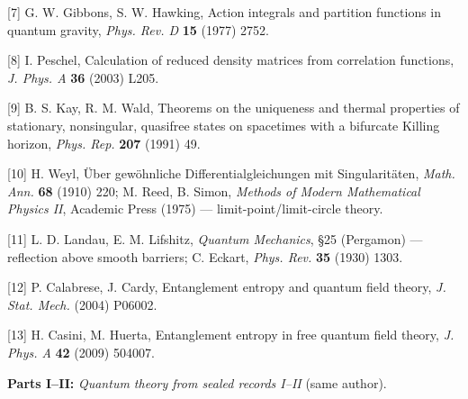 \documentclass[11pt]{article}
\begin{document}
[7] G. W. Gibbons, S. W. Hawking, Action integrals and partition functions in quantum gravity, \emph{Phys. Rev. D} \textbf{15} (1977) 2752.

[8] I. Peschel, Calculation of reduced density matrices from correlation functions, \emph{J. Phys. A} \textbf{36} (2003) L205.

[9] B. S. Kay, R. M. Wald, Theorems on the uniqueness and thermal properties of stationary, nonsingular, quasifree states on spacetimes with a bifurcate Killing horizon, \emph{Phys. Rep.} \textbf{207} (1991) 49.

[10] H. Weyl, Über gewöhnliche Differentialgleichungen mit Singularitäten, \emph{Math. Ann.} \textbf{68} (1910) 220; M. Reed, B. Simon, \emph{Methods of Modern Mathematical Physics II}, Academic Press (1975) — limit-point/limit-circle theory.

[11] L. D. Landau, E. M. Lifshitz, \emph{Quantum Mechanics}, §25 (Pergamon) — reflection above smooth barriers; C. Eckart, \emph{Phys. Rev.} \textbf{35} (1930) 1303.

[12] P. Calabrese, J. Cardy, Entanglement entropy and quantum field theory, \emph{J. Stat. Mech.} (2004) P06002.

[13] H. Casini, M. Huerta, Entanglement entropy in free quantum field theory, \emph{J. Phys. A} \textbf{42} (2009) 504007.

\textbf{Parts I–II:} \emph{Quantum theory from sealed records I–II} (same author).
\end{document}
